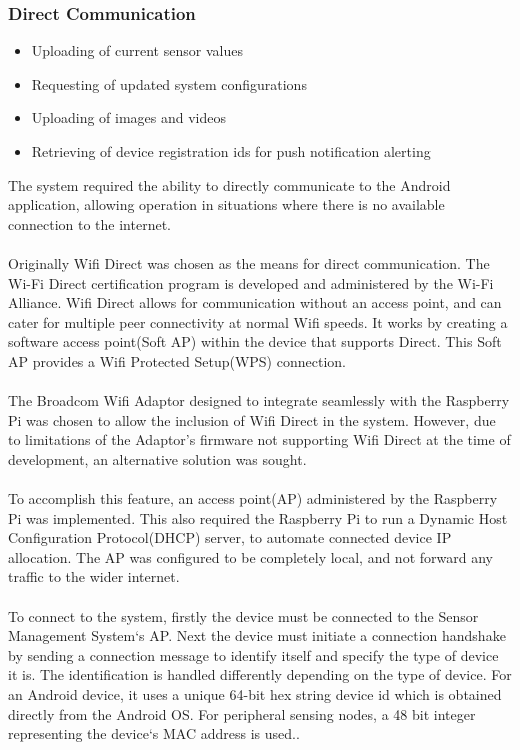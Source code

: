 \documentclass{article}
\begin{document}
\subsubsection{Direct Communication}
\label{sssec:sms_direct_comm}
\begin{itemize}
  \item Uploading of current sensor values
  \item Requesting of updated system configurations
  \item Uploading of images and videos
  \item Retrieving of device registration ids for push notification alerting
\end{itemize}
The system required the ability to directly communicate to the Android application, allowing operation in situations where there is no available connection to the internet.\\\\
Originally Wifi Direct was chosen as the means for direct communication. The Wi-Fi Direct certification program is developed and administered by the Wi-Fi Alliance.
Wifi Direct allows for communication without an access point, and can cater for multiple peer connectivity at normal Wifi speeds. 
It works by creating a software access point(Soft AP) within the device that supports Direct. This Soft AP provides a Wifi Protected Setup(WPS) connection.\\\\
The Broadcom Wifi Adaptor designed to integrate seamlessly with the Raspberry Pi was chosen to allow the inclusion of Wifi Direct in the system. However, due to limitations of the Adaptor’s firmware not supporting Wifi Direct at the time of development, an alternative solution was sought. \\\\
To accomplish this feature, an access point(AP) administered by the Raspberry Pi was implemented. This also required the Raspberry Pi to run a Dynamic Host Configuration Protocol(DHCP) server, to automate connected device IP allocation. The AP was configured to be completely local, and not forward any traffic to the wider internet. \\\\
To connect to the system, firstly the device must be connected to the Sensor Management System\lq s AP. Next the device must initiate a connection handshake by sending a connection message to identify itself and specify the type of device it is. The identification is handled differently depending on the type of device. For an Android device, it uses a unique 64-bit hex string device id which is obtained directly from the Android OS. For peripheral sensing nodes, a 48 bit integer representing the device\lq s MAC address is used.. \\\\
\end{document}

